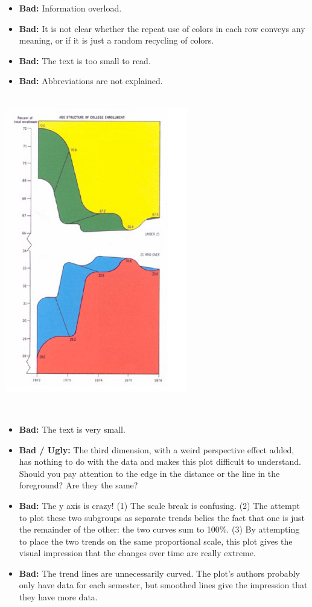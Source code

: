\documentclass[]{book}
\providecommand{\tightlist}{%
  \setlength{\itemsep}{0pt}\setlength{\parskip}{0pt}}
\begin{document}
\begin{itemize}
\tightlist
\item
  \textbf{Bad:} Information overload.
\item
  \textbf{Bad:} It is not clear whether the repeat use of colors in each row conveys any meaning, or if it is just a random recycling of colors.
\item
  \textbf{Bad:} The text is too small to read.\\
\item
  \textbf{Bad:} Abbreviations are not explained.
\end{itemize}

~\\

\includegraphics[width=0.6\textwidth,height=\textheight]{img/vis8.jpeg}

~

\begin{itemize}
\tightlist
\item
  \textbf{Bad:} The text is very small.
\item
  \textbf{Bad / Ugly:} The third dimension, with a weird perspective effect added, has nothing to do with the data and makes this plot difficult to understand. Should you pay attention to the edge in the distance or the line in the foreground? Are they the same?\\
\item
  \textbf{Bad:} The y axis is crazy! (1) The scale break is confusing. (2) The attempt to plot these two subgroups as separate trends belies the fact that one is just the remainder of the other: the two curves sum to 100\%. (3) By attempting to place the two trends on the same proportional scale, this plot gives the visual impression that the changes over time are really extreme.
\item
  \textbf{Bad:} The trend lines are unnecessarily curved. The plot's authors probably only have data for each semester, but smoothed lines give the impression that they have more data.
\end{itemize}
\end{document}
